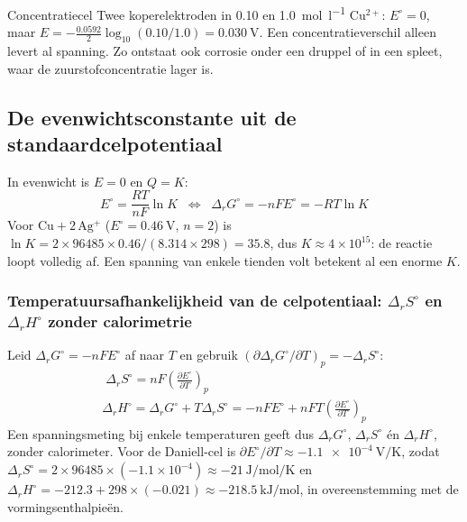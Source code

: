 \begin{voorbeeld}{Concentratiecel}
Twee koperelektroden in \SI{0.10}{} en \SI{1.0}{\mole\per\litre} $\mathrm{Cu^{2+}}$: $E^\circ = 0$, maar $E = -\frac{0.0592}{2}\log_{10}(0.10/1.0) = \SI{0.030}{\volt}$. Een concentratieverschil alleen levert al spanning. Zo ontstaat ook corrosie onder een druppel of in een spleet, waar de zuurstofconcentratie lager is.
\end{voorbeeld}

\subsection{De evenwichtsconstante uit de standaardcelpotentiaal}
\label{sec:evenwichtsconstante-elektrochemie}

In evenwicht is $E = 0$ en $Q = K$:
\begin{equation}
\boxed{\;E^\circ = \frac{RT}{nF} \ln K \;\;\Leftrightarrow\;\; \Delta_r G^\circ = -nFE^\circ = -RT \ln K\;}
\label{eq:K-uit-E0}
\end{equation}
Voor $\mathrm{Cu + 2\,Ag^+}$ ($E^\circ = \SI{0.46}{\volt}$, $n = 2$) is $\ln K = 2 \times 96485 \times 0.46/(8.314 \times 298) = 35.8$, dus $K \approx 4\times10^{15}$: de reactie loopt volledig af. Een spanning van enkele tienden volt betekent al een enorme $K$.

\subsubsection{Temperatuursafhankelijkheid van de celpotentiaal: $\Delta_rS^\circ$ en $\Delta_rH^\circ$ zonder calorimetrie}
\label{sec:temperatuur-E}

Leid $\Delta_rG^\circ = -nFE^\circ$ af naar $T$ en gebruik $(\partial \Delta_rG^\circ/\partial T)_p = -\Delta_rS^\circ$:
\begin{gather}
\boxed{\;\Delta_rS^\circ = nF\left(\frac{\partial E^\circ}{\partial T}\right)_p\;}
\label{eq:dSdE}\\
\Delta_rH^\circ = \Delta_rG^\circ + T\Delta_rS^\circ = -nFE^\circ + nFT\left(\frac{\partial E^\circ}{\partial T}\right)_p
\label{eq:dH-uit-E}
\end{gather}
Een spanningsmeting bij enkele temperaturen geeft dus $\Delta_rG^\circ$, $\Delta_rS^\circ$ \'en $\Delta_rH^\circ$, zonder calorimeter. Voor de Daniell-cel is $\partial E^\circ/\partial T \approx \SI{-1.1e-4}{\volt\per\kelvin}$, zodat $\Delta_rS^\circ = 2 \times 96485 \times (-1.1\times10^{-4}) \approx \SI{-21}{\joule\per\mole\per\kelvin}$ en $\Delta_rH^\circ = -212.3 + 298 \times (-0.021) \approx \SI{-218.5}{\kilo\joule\per\mole}$, in overeenstemming met de vormingsenthalpie\"en.

